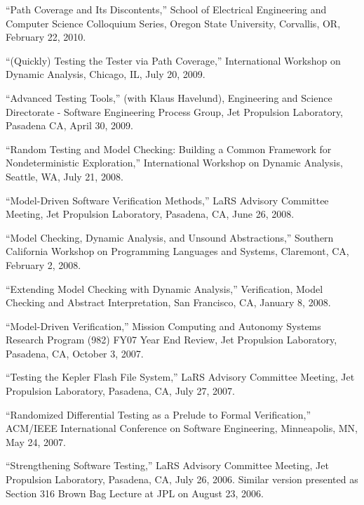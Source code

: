 \documentclass[ComputerScience]{vita}
\begin{document}
\begin{vita}
\begin{Selected Presentations}
\item ``Path Coverage and Its Discontents,'' School of Electrical Engineering and Computer Science Colloquium Series, Oregon State University, Corvallis, OR, February 22, 2010.

\item ``(Quickly) Testing the Tester via Path Coverage,'' International Workshop on Dynamic Analysis, Chicago, IL, July 20, 2009.

\item ``Advanced Testing Tools,'' (with Klaus Havelund), Engineering and Science Directorate - Software Engineering Process Group, Jet Propulsion Laboratory, Pasadena CA, April 30, 2009.

\item ``Random Testing and Model Checking:   Building a Common Framework for Nondeterministic Exploration,'' International Workshop on Dynamic Analysis, Seattle, WA, July 21, 2008.

\item ``Model-Driven Software Verification Methods,'' LaRS Advisory Committee Meeting, Jet Propulsion Laboratory, Pasadena, CA, June 26, 2008.


\item ``Model Checking, Dynamic Analysis, and Unsound Abstractions,'' Southern California Workshop on Programming Languages and Systems, Claremont, CA, February 2, 2008.

\item ``Extending Model Checking with Dynamic Analysis,'' Verification, Model Checking and Abstract Interpretation, San Francisco, CA, January 8, 2008.

\item ``Model-Driven Verification,'' Mission Computing and Autonomy Systems Research Program (982) FY07 Year End Review, Jet Propulsion Laboratory, Pasadena, CA, October 3, 2007.

\item ``Testing the Kepler Flash File System,'' LaRS Advisory Committee Meeting, Jet Propulsion Laboratory, Pasadena, CA, July 27, 2007.

\item ``Randomized Differential Testing as a Prelude to Formal Verification,'' ACM/IEEE International Conference on Software Engineering, Minneapolis, MN, May 24, 2007.

\item ``Strengthening Software Testing,'' LaRS Advisory Committee Meeting, Jet Propulsion Laboratory, Pasadena, CA, July 26, 2006.  Similar version presented as Section 316 Brown Bag Lecture at JPL on August 23, 2006.


\end{Selected Presentations}
\end{vita}
\end{document}
